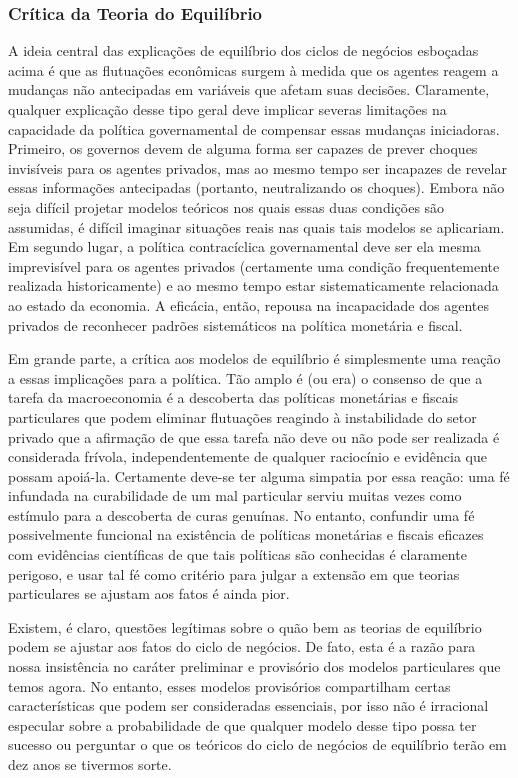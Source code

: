\documentclass[12pt]{article}
\begin{document}
\subsubsection{\textbf{Crítica da Teoria do Equilíbrio}}
A ideia central das explicações de equilíbrio dos ciclos de negócios esboçadas acima é que as flutuações econômicas surgem à medida que os agentes reagem a mudanças não antecipadas em variáveis que afetam suas decisões. Claramente, qualquer explicação desse tipo geral deve implicar severas limitações na capacidade da política governamental de compensar essas mudanças iniciadoras. Primeiro, os governos devem de alguma forma ser capazes de prever choques invisíveis para os agentes privados, mas ao mesmo tempo ser incapazes de revelar essas informações antecipadas (portanto, neutralizando os choques). Embora não seja difícil projetar modelos teóricos nos quais essas duas condições são assumidas, é difícil imaginar situações reais nas quais tais modelos se aplicariam. Em segundo lugar, a política contracíclica governamental deve ser ela mesma imprevisível para os agentes privados (certamente uma condição frequentemente realizada historicamente) e ao mesmo tempo estar sistematicamente relacionada ao estado da economia. A eficácia, então, repousa na incapacidade dos agentes privados de reconhecer padrões sistemáticos na política monetária e fiscal.

Em grande parte, a crítica aos modelos de equilíbrio é simplesmente uma reação a essas implicações para a política. Tão amplo é (ou era) o consenso de que a tarefa da macroeconomia é a descoberta das políticas monetárias e fiscais particulares que podem eliminar flutuações reagindo à instabilidade do setor privado que a afirmação de que essa tarefa não deve ou não pode ser realizada é considerada frívola, independentemente de qualquer raciocínio e evidência que possam apoiá-la. Certamente deve-se ter alguma simpatia por essa reação: uma fé infundada na curabilidade de um mal particular serviu muitas vezes como estímulo para a descoberta de curas genuínas. No entanto, confundir uma fé possivelmente funcional na existência de políticas monetárias e fiscais eficazes com evidências científicas de que tais políticas são conhecidas é claramente perigoso, e usar tal fé como critério para julgar a extensão em que teorias particulares se ajustam aos fatos é ainda pior.

Existem, é claro, questões legítimas sobre o quão bem as teorias de equilíbrio podem se ajustar aos fatos do ciclo de negócios. De fato, esta é a razão para nossa insistência no caráter preliminar e provisório dos modelos particulares que temos agora. No entanto, esses modelos provisórios compartilham certas características que podem ser consideradas essenciais, por isso não é irracional especular sobre a probabilidade de que qualquer modelo desse tipo possa ter sucesso ou perguntar o que os teóricos do ciclo de negócios de equilíbrio terão em dez anos se tivermos sorte.
\end{document}
